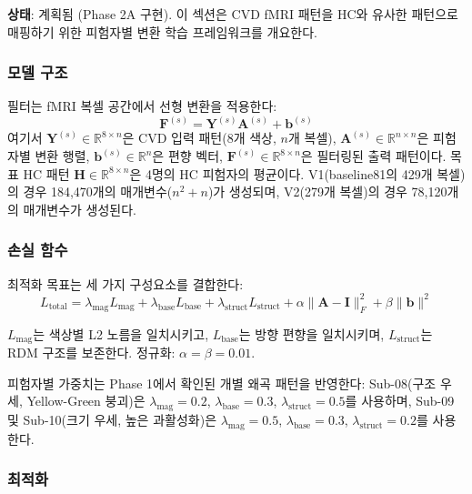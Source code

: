 \documentclass[12pt,a4paper]{article}
\begin{document}
\textbf{상태}: 계획됨 (Phase 2A 구현). 이 섹션은 CVD fMRI 패턴을 HC와 유사한 패턴으로 매핑하기 위한 피험자별 변환 학습 프레임워크를 개요한다.

\subsubsection{모델 구조}

필터는 fMRI 복셀 공간에서 선형 변환을 적용한다:
\begin{equation}
\mathbf{F}^{(s)} = \mathbf{Y}^{(s)} \mathbf{A}^{(s)} + \mathbf{b}^{(s)}
\end{equation}
여기서 $\mathbf{Y}^{(s)} \in \mathbb{R}^{8 \times n}$은 CVD 입력 패턴(8개 색상, $n$개 복셀), $\mathbf{A}^{(s)} \in \mathbb{R}^{n \times n}$은 피험자별 변환 행렬, $\mathbf{b}^{(s)} \in \mathbb{R}^n$은 편향 벡터, $\mathbf{F}^{(s)} \in \mathbb{R}^{8 \times n}$은 필터링된 출력 패턴이다. 목표 HC 패턴 $\mathbf{H} \in \mathbb{R}^{8 \times n}$은 4명의 HC 피험자의 평균이다. V1(baseline81의 429개 복셀)의 경우 184,470개의 매개변수($n^2 + n$)가 생성되며, V2(279개 복셀)의 경우 78,120개의 매개변수가 생성된다.

\subsubsection{손실 함수}

최적화 목표는 세 가지 구성요소를 결합한다:
\begin{equation}
L_{\text{total}} = \lambda_{\text{mag}} L_{\text{mag}} + \lambda_{\text{base}} L_{\text{base}} + \lambda_{\text{struct}} L_{\text{struct}} + \alpha \|\mathbf{A} - \mathbf{I}\|_F^2 + \beta \|\mathbf{b}\|^2
\end{equation}

$L_{\text{mag}}$는 색상별 L2 노름을 일치시키고, $L_{\text{base}}$는 방향 편향을 일치시키며, $L_{\text{struct}}$는 RDM 구조를 보존한다. 정규화: $\alpha = \beta = 0.01$.

피험자별 가중치는 Phase 1에서 확인된 개별 왜곡 패턴을 반영한다: Sub-08(구조 우세, Yellow-Green 붕괴)은 $\lambda_{\text{mag}}=0.2$, $\lambda_{\text{base}}=0.3$, $\lambda_{\text{struct}}=0.5$를 사용하며, Sub-09 및 Sub-10(크기 우세, 높은 과활성화)은 $\lambda_{\text{mag}}=0.5$, $\lambda_{\text{base}}=0.3$, $\lambda_{\text{struct}}=0.2$를 사용한다.

\subsubsection{최적화}
\end{document}
